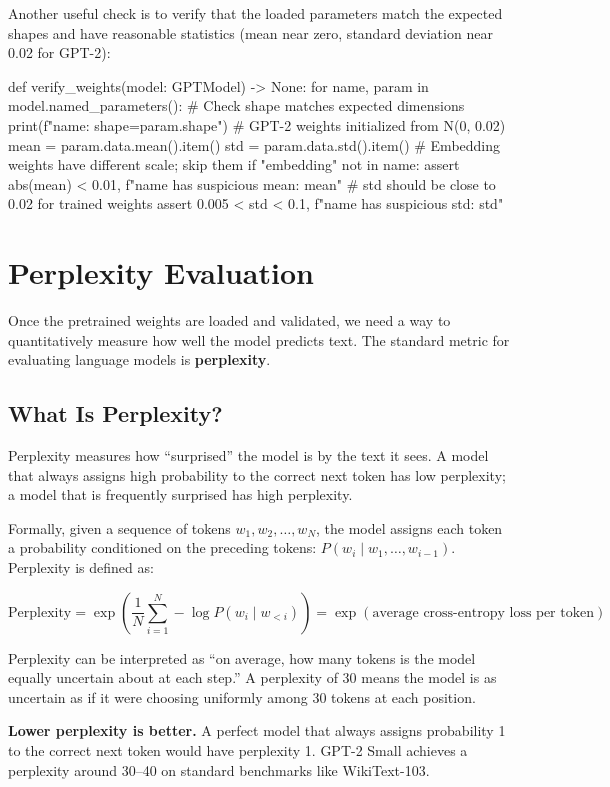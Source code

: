 Another useful check is to verify that the loaded parameters match the
expected shapes and have reasonable statistics (mean near zero, standard
deviation near 0.02 for GPT-2):

\begin{pseudocode}
def verify_weights(model: GPTModel) -> None:
    for name, param in model.named_parameters():
        # Check shape matches expected dimensions
        print(f"{name}: shape={param.shape}")
        # GPT-2 weights initialized from N(0, 0.02)
        mean = param.data.mean().item()
        std = param.data.std().item()
        # Embedding weights have different scale; skip them
        if "embedding" not in name:
            assert abs(mean) < 0.01, f"{name} has suspicious mean: {mean}"
            # std should be close to 0.02 for trained weights
            assert 0.005 < std < 0.1, f"{name} has suspicious std: {std}"
\end{pseudocode}

\section{Perplexity Evaluation}

Once the pretrained weights are loaded and validated, we need a way to
quantitatively measure how well the model predicts text. The standard
metric for evaluating language models is \textbf{perplexity}.

\subsection{What Is Perplexity?}

Perplexity measures how ``surprised'' the model is by the text it sees. A
model that always assigns high probability to the correct next token has
low perplexity; a model that is frequently surprised has high perplexity.

Formally, given a sequence of tokens $w_1, w_2, \ldots, w_N$, the model
assigns each token a probability conditioned on the preceding tokens:
$P(w_i \mid w_1, \ldots, w_{i-1})$. Perplexity is defined as:

\[
  \text{Perplexity} = \exp\!\left(\frac{1}{N}\sum_{i=1}^{N} -\log P(w_i \mid w_{<i})\right)
  = \exp(\text{average cross-entropy loss per token})
\]

\begin{keyconcept}
  Perplexity can be interpreted as ``on average, how many tokens is the
  model equally uncertain about at each step.'' A perplexity of 30
  means the model is as uncertain as if it were choosing uniformly among
  30 tokens at each position.

  \textbf{Lower perplexity is better.} A perfect model that always assigns
  probability 1 to the correct next token would have perplexity 1. GPT-2
  Small achieves a perplexity around 30--40 on standard benchmarks like
  WikiText-103.
\end{keyconcept}

